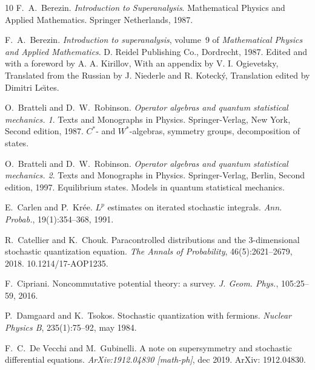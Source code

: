\documentclass{article}
\newcommand{\tmtextit}[1]{{\itshape{#1}}}
\begin{document}
\begin{thebibliography}{10}
  F.~A.~Berezin.
  {\newblock}\tmtextit{Introduction to Superanalysis}. {\newblock}Mathematical
  Physics and Applied Mathematics. Springer Netherlands, 1987.{\newblock}
  
  F.~A.~Berezin. {\newblock}\tmtextit{Introduction to
  superanalysis},  volume~9  of \tmtextit{Mathematical Physics and Applied
  Mathematics}. {\newblock}D. Reidel Publishing Co., Dordrecht, 1987.
  {\newblock}Edited and with a foreword by A. A. Kirillov, With an appendix by
  V. I. Ogievetsky, Translated from the Russian by J. Niederle and R.
  Koteck{\'y}, Translation edited by Dimitri Le\u{\i}tes.{\newblock}
  
  O.~Bratteli  and  D.~W.~Robinson.
  {\newblock}\tmtextit{Operator algebras and quantum statistical mechanics.
  1}. {\newblock}Texts and Monographs in Physics. Springer-Verlag, New York,
  Second  edition, 1987. {\newblock}$C^{\ast}$- and $W^{\ast}$-algebras,
  symmetry groups, decomposition of states.{\newblock}
  
  O.~Bratteli  and  D.~W.~Robinson.
  {\newblock}\tmtextit{Operator algebras and quantum statistical mechanics.
  2}. {\newblock}Texts and Monographs in Physics. Springer-Verlag, Berlin,
  Second  edition, 1997. {\newblock}Equilibrium states. Models in quantum
  statistical mechanics.{\newblock}
  
  E.~Carlen  and  P.~Kr{\'e}e. {\newblock}$L^p$ estimates
  on iterated stochastic integrals. {\newblock}\tmtextit{Ann. Probab.},
  19(1):354--368, 1991.{\newblock}
  
  R.~Catellier  and  K.~Chouk.
  {\newblock}Paracontrolled distributions and the 3-dimensional stochastic
  quantization equation. {\newblock}\tmtextit{The Annals of Probability},
  46(5):2621--2679, 2018.
  {\newblock}\href{Https://doi.org/10.1214/17-AOP1235}{}10.1214/17-AOP1235.{\newblock}
  
  F.~Cipriani. {\newblock}Noncommutative potential
  theory: a survey. {\newblock}\tmtextit{J. Geom. Phys.}, 105:25--59,
  2016.{\newblock}
  
  P.~Damgaard  and  K.~Tsokos.
  {\newblock}Stochastic quantization with fermions.
  {\newblock}\tmtextit{Nuclear Physics B}, 235(1):75--92, may 1984.{\newblock}
  
  F.~C.~De Vecchi  and  M.~Gubinelli.
  {\newblock}A note on supersymmetry and stochastic differential equations.
  {\newblock}\tmtextit{ArXiv:1912.04830 [math-ph]}, dec 2019.
  {\newblock}ArXiv: 1912.04830.{\newblock}
  

\end{thebibliography}
\end{document}
